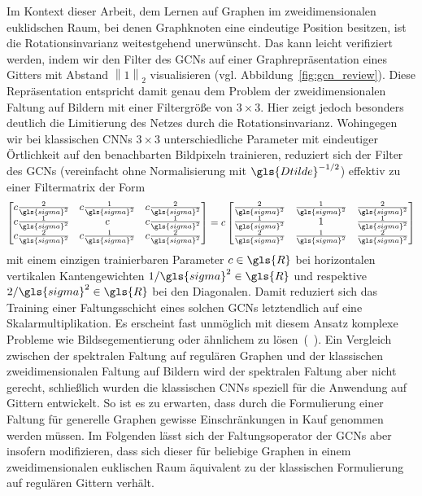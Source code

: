 Im Kontext dieser Arbeit, dem Lernen auf Graphen im zweidimensionalen euklidschen Raum, bei denen Graphknoten eine eindeutige Position besitzen, ist die Rotationsinvarianz weitestgehend unerwünscht.
Das kann leicht verifiziert werden, indem wir den Filter des \glspl{GCN} auf einer Graphrepräsentation eines Gitters mit Abstand $\left\|1\right\|_2$ visualisieren (vgl. Abbildung~\ref{fig:gcn_review}).
Diese Repräsentation entspricht damit genau dem Problem der zweidimensionalen Faltung auf Bildern mit einer Filtergröße von $3 \times 3$.
Hier zeigt jedoch besonders deutlich die Limitierung des Netzes durch die Rotationsinvarianz.
Wohingegen wir bei klassischen \glspl{CNN} $3 \times 3$ unterschiedliche Parameter mit eindeutiger Örtlichkeit auf den benachbarten Bildpixeln trainieren, reduziert sich der Filter des \glspl{GCN} (vereinfacht ohne Normalisierung mit $\gls{Dtilde}^{-1/2}$) effektiv zu einer Filtermatrix der Form
\begin{equation*}
  \begin{bmatrix}
    c \frac{2}{\gls{sigma}^2} & c \frac{1}{\gls{sigma}^2} & c \frac{2}{\gls{sigma}^2}\\
    c \frac{1}{\gls{sigma}^2} & c  & c \frac{1}{\gls{sigma}^2}\\
    c \frac{2}{\gls{sigma}^2} & c \frac{1}{\gls{sigma}^2} & c \frac{2}{\gls{sigma}^2}
  \end{bmatrix} = c \begin{bmatrix}
    \frac{2}{\gls{sigma}^2} & \frac{1}{\gls{sigma}^2} & \frac{2}{\gls{sigma}^2}\\
    \frac{1}{\gls{sigma}^2} & 1  & \frac{1}{\gls{sigma}^2}\\
    \frac{2}{\gls{sigma}^2} & \frac{1}{\gls{sigma}^2} & \frac{2}{\gls{sigma}^2}
  \end{bmatrix}
\end{equation*}
mit einem einzigen trainierbaren Parameter $c \in \gls{R}$ bei horizontalen \bzw{} vertikalen Kantengewichten $1/\gls{sigma}^2 \in \gls{R}$ und respektive $2/\gls{sigma}^2 \in \gls{R}$ bei den Diagonalen.
Damit reduziert sich das Training einer Faltungsschicht eines solchen \glspl{GCN} letztendlich auf eine Skalarmultiplikation.
Es erscheint fast unmöglich mit diesem Ansatz komplexe Probleme wie \zB{} Bildsegementierung oder ähnlichem zu lösen~(\vgl{}~\cite{gcn_review}).
Ein Vergleich zwischen der spektralen Faltung auf regulären Graphen und der klassischen zweidimensionalen Faltung auf Bildern wird der spektralen Faltung aber nicht gerecht, schließlich wurden die klassischen \glspl{CNN} speziell für die Anwendung auf Gittern entwickelt.
So ist es zu erwarten, dass durch die Formulierung einer Faltung für generelle Graphen gewisse Einschränkungen in Kauf genommen werden müssen.
Im Folgenden lässt sich der Faltungsoperator der \glspl{GCN} aber insofern modifizieren, dass sich dieser für beliebige Graphen in einem zweidimensionalen euklischen Raum äquivalent zu der klassischen Formulierung auf regulären Gittern verhält.

